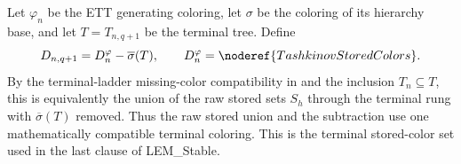 \begin{definition}
Let $\varphi_n$ be the ETT generating coloring, let $\sigma$ be the
coloring of its hierarchy base, and let $T=T_{n,q+1}$ be the terminal
tree.  Define
\[
 D_{n,q+1}=D_n^{\varphi}-\overline\sigma(T),
 \qquad
 D_n^{\varphi}=\noderef{TashkinovStoredColors}.
\]
By the terminal-ladder missing-color compatibility in
 and the inclusion $T_n\subseteq T$, this is
equivalently the union of the raw stored sets $S_h$ through the terminal
rung with $\overline\sigma(T)$ removed.  Thus the raw stored union and
the subtraction use one mathematically compatible terminal coloring.
This is the terminal stored-color set used in the last clause of
\textup{LEM\_Stable}.
\end{definition}

